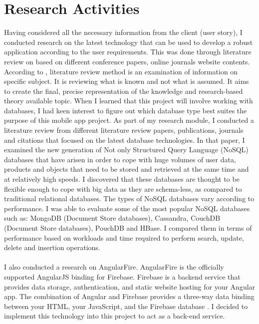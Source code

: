 \section{Research Activities}
Having considered all the necessary information from the client (user story), I conducted research on the latest technology that can be used to develop a robust application according to the user requirements. This was done through literature review on based on different conference papers, online journals website contents. 
According to \cite{Dawidowicz}, literature review method is an examination of information on specific subject. It is reviewing what is known and not what is assumed. It aims to create the final, precise representation of the knowledge and research-based theory available topic. When I learned that this project will involve working with databases, I had keen interest to figure out which database type best suites the purpose of this mobile app project. As part of my research module, I conducted a literature review \cite{NoSQL} from different literature review papers, publications, journals and citations that focused on the latest database technologies. In that paper, I examined the new generation of Not only Structured Query Language (NoSQL) databases that have arisen in order to cope with huge volumes of user data, products and objects that need to be stored and retrieved at the same time and at relatively high speeds. I discovered that these databases are thought to be flexible enough to cope with big data as they are schema-less, as compared to traditional relational databases. The types of NoSQL databases vary according to performance. I was able to evaluate some of the most popular NoSQL databases such as: MongoDB (Document Store databases), Cassandra, CouchDB (Document Store databases), PouchDB and HBase. I compared them in terms of performance based on workloads and time required to perform search, update, delete and insertion operations. 

\paragraph{}
I also conducted a research on AngularFire. AngularFire is the officially supported AngularJS binding for Firebase.  Firebase is a backend service that provides data storage, authentication, and static website hosting for your Angular app. The combination of Angular and Firebase provides a three-way data binding between your HTML, your JavaScript, and the Firebase database \cite{Firebase}. I decided to implement this technology into this project to act as a back-end service.

